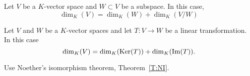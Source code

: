 \documentclass{ximera}
\begin{document}
\begin{corollary}
  Let $V$ be a $K$-vector space and $W\subset V$ be a subspace. In
  this case,
  \[
  \dim_K(V) = \dim_K(W) + \dim_K(V/W)
  \]
\end{corollary}



\begin{corollary}
  Let $V$ and $W$ be a $K$-vector spaces and let $T:V\to W$ be a
  linear transformation. In this case
  \[
  \dim_K(V) = \dim_K(\mathop{\mathrm{Ker}}\nolimits(T)) + \dim_K(\operatorname{Im}(T)).
  \]
  \begin{sketch}
    Use Noether's isomorphism theorem, Theorem~\ref{T:NI}.
  \end{sketch}
\end{corollary}
\end{document}
